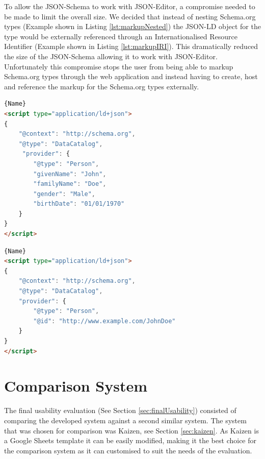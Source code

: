 To allow the JSON-Schema to work with JSON-Editor, a compromise needed to be made to limit the overall size. We decided that instead of nesting Schema.org types (Example shown in Listing \ref{lst:markupNested}) the JSON-LD object for the type would be externally referenced through an Internationalised Resource Identifier (Example shown in Listing \ref{lst:markupIRI}). This dramatically reduced the size of the JSON-Schema allowing it to work with JSON-Editor. Unfortunately this compromise stops the user from being able to markup Schema.org types through the web application and instead having to create, host and reference the markup for the Schema.org types externally. \newline


{
\noindent\begin{minipage}{.45\textwidth}
\begin{lstlisting}[caption=Example Markup Nested, captionpos=b,language=html,showstringspaces=false,basicstyle=\footnotesize,label={lst:markupNested}]{Name}
<script type="application/ld+json">
{
    "@context": "http://schema.org",
    "@type": "DataCatalog",
     "provider": {
        "@type": "Person",
        "givenName": "John",
        "familyName": "Doe",
        "gender": "Male",
        "birthDate": "01/01/1970"
    }
}
</script>
\end{lstlisting}
\end{minipage}\hfill
\begin{minipage}{.45\textwidth}
\begin{lstlisting}[caption=Example Markup IRI, captionpos=b,language=html,showstringspaces=false,basicstyle=\footnotesize,label={lst:markupIRI}]{Name}
<script type="application/ld+json">
{
    "@context": "http://schema.org",
    "@type": "DataCatalog",
    "provider": {
        "@type": "Person",
        "@id": "http://www.example.com/JohnDoe"
    }
}
</script>
\end{lstlisting}
\end{minipage}
}

\newpage
\section{Comparison System}\label{sec:comparisonsystem}
The final usability evaluation (See Section \ref{sec:finalUsability}) consisted of comparing the developed system against a second similar system. The system that was chosen for comparison was Kaizen, see Section \ref{sec:kaizen}. As Kaizen is a Google Sheets template it can be easily modified, making it the best choice for the comparison system as it can customised to suit the needs of the evaluation.\newline

